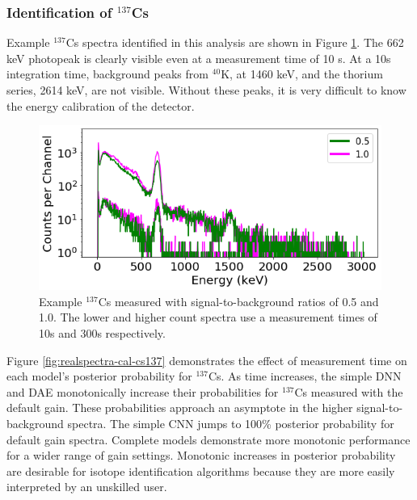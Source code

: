 \subsubsection{Identification of $^{137}$Cs}

Example $^{137}$Cs spectra identified in this analysis are shown in Figure \ref{fig:realspectra-cal-cs137-spec}. The 662 keV photopeak is clearly visible even at a measurement time of 10 s. At a 10s integration time, background peaks from $^{40}$K, at 1460 keV, and the thorium series, 2614 keV, are not visible. Without these peaks, it is very difficult to know the energy calibration of the detector.

\begin{figure}[H]
	\centering
	\includegraphics[width=0.85\linewidth]{images/realspectra-cal-cs137-spec}
	\caption{Example $^{137}$Cs measured with signal-to-background ratios of 0.5 and 1.0. The lower and higher count spectra use a measurement times of 10s and 300s respectively.}
	\label{fig:realspectra-cal-cs137-spec}
\end{figure}

Figure \ref{fig:realspectra-cal-cs137} demonstrates the effect of measurement time on each model's posterior probability for $^{137}$Cs. As time increases, the simple DNN and DAE monotonically increase their probabilities for $^{137}$Cs measured with the default gain. These probabilities approach an asymptote in the higher signal-to-background spectra. The simple CNN jumps to 100\% posterior probability for default gain spectra. Complete models demonstrate more monotonic performance for a wider range of gain settings. Monotonic increases in posterior probability are desirable for isotope identification algorithms because they are more easily interpreted by an unskilled user.

